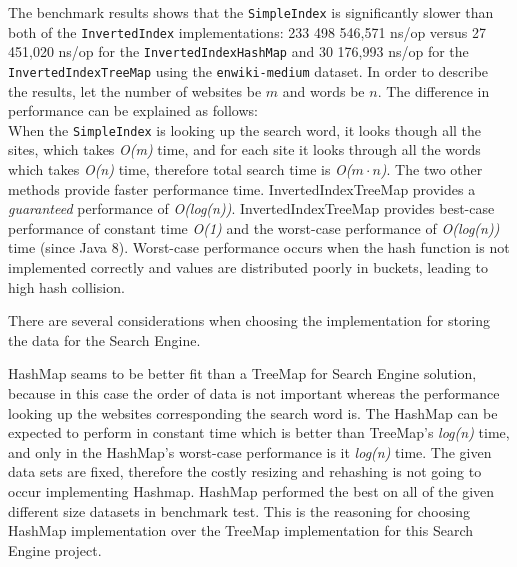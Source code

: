 
The benchmark results shows that the {\tt SimpleIndex} is significantly slower than both of the {\tt InvertedIndex} implementations: 233 498 546,571 ns/op versus 27 451,020 ns/op for the {\tt InvertedIndexHashMap} and 30 176,993 ns/op for the {\tt InvertedIndexTreeMap} using the {\tt enwiki-medium} dataset.
In order to describe the results, let the number of websites be $m$ and words be $n$.
The difference in performance can be explained as follows:\\
When the {\tt SimpleIndex} is looking up the search word, it looks though all the sites, which takes \textit{O(m)} time, and for each site it looks through all the words which takes \textit{O(n)} time, therefore total search time is \textit{O($m\cdot n$)}. The two other methods provide faster performance time. InvertedIndexTreeMap provides a \textit{guaranteed} performance of \textit{O(log(n))}. InvertedIndexTreeMap provides best-case performance of constant time \textit{O(1)} and the worst-case performance of \textit{O(log(n))} time (since Java 8). Worst-case performance occurs when the hash function is not implemented correctly and values are distributed poorly in buckets, leading to high hash collision.

There are several considerations when choosing the implementation for storing the data for the Search Engine.

HashMap seams to be better fit than a TreeMap for Search Engine solution, because in this case the order of data is not important whereas the performance looking up the websites corresponding the search word is. The HashMap can be expected to perform in constant time which is better than TreeMap's \textit{log(n)} time, and only in the HashMap's worst-case performance is it \textit{log(n)} time. The given data sets are fixed, therefore the costly resizing and rehashing is not going to occur implementing Hashmap. HashMap performed the best on all of the given different size datasets in benchmark test. This is the reasoning for choosing HashMap implementation over the TreeMap implementation for this Search Engine project.

